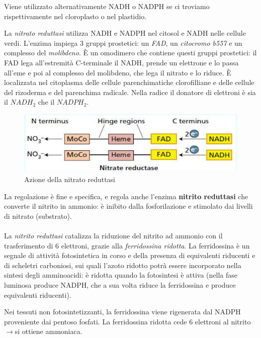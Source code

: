 \documentclass[a4paper,12pt]{book}
\newcommand{\lfreccia}{\ensuremath{\longrightarrow}}
\begin{document}
Viene utilizzato alternativamente NADH o NADPH se ci troviamo rispettivamente nel cloroplasto o nel plastidio.

La \emph{nitrato reduttasi} utilizza NADH e NADPH nel citosol e NADH nelle cellule verdi. L'enzima impiega 3 gruppi prostetici: un \emph{FAD}, un \emph{citocromo b557} e un complesso del \emph{molibdeno}. È un omodimero che contiene questi gruppi prostetici: il FAD lega all'estremità C-terminale il NADH, prende un elettrone e lo passa all'eme e poi al complesso del molibdeno, che lega il nitrato e lo riduce. È localizzata nel citoplasma delle cellule parenchimatiche clorofilliane e delle cellule del rizoderma e del parenchima radicale. Nella radice il donatore di
elettroni è sia il $NADH_{2}$ che il $NADPH_{2}$.
\begin{figure}[H]
\centering
\includegraphics[scale=0.43]{immagini/nitrato_reduttasi.jpg}
\caption{Azione della nitrato reduttasi}
\end{figure}

La regolazione è fine e specifica, e regola anche l'enzima \textbf{nitrito reduttasi} che converte il nitrito in ammonio: è inibito dalla fosforilazione e stimolato dai livelli di nitrato (substrato).
\paragraph{}
La \emph{nitrito reduttasi} catalizza la riduzione del nitrito ad ammonio con il trasferimento di 6 elettroni, grazie alla \emph{ferridossina ridotta}. La ferridossina è un segnale di attività fotosintetica in corso e della presenza di equivalenti riducenti e di scheletri carboniosi, sui quali l'azoto ridotto potrà essere incorporato nella sintesi degli amminoacidi: è ridotta quando la fotosintesi è attiva (nella fase luminosa produce NADPH, che a sua volta riduce la ferridossina e produce equivalenti riducenti).

Nei tessuti non fotosintetizzanti, la ferridossina viene rigenerata dal NADPH proveniente dai pentoso fosfati.
La ferridossina ridotta cede 6 elettroni al nitrito \lfreccia si ottiene ammoniaca.
\end{document}
